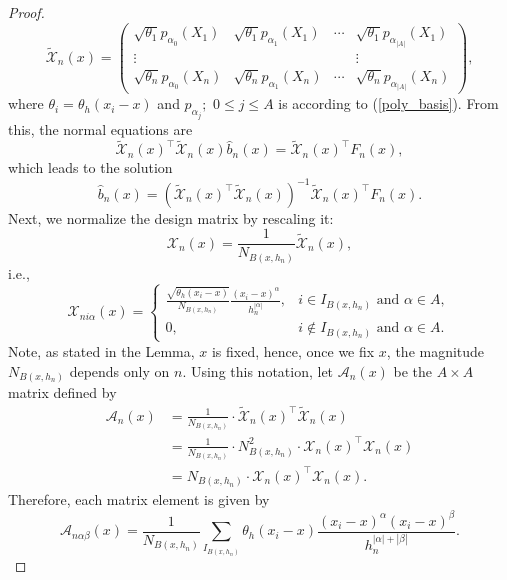 \documentclass{article}
\begin{document}
\begin{proof}
\begin{equation*}
    \tilde{\mathscr{X}}_n(x) = \left(
\begin{array}{cccc}
\sqrt{\theta_1} p_{\alpha_0}(X_1) & \sqrt{\theta_1} p_{\alpha_1}(X_1) & \cdots & \sqrt{\theta_1} p_{\alpha_{|A|}}(X_1) \\
\vdots & & & \vdots \\
\sqrt{\theta_n} p_{\alpha_0}(X_n) & \sqrt{\theta_n} p_{\alpha_1}(X_n) & \cdots & \sqrt{\theta_n} p_{\alpha_{|A|}}(X_n)
\end{array}
\right),
\end{equation*}
where $\theta_i=\theta_h(x_i-x)$ and $p_{\alpha_j}; \,\,0\leq j\leq A$ is according to (\ref{poly_basis}).
From this, the normal equations are
\[
 \tilde{\mathscr{X}}_n(x)^\top \tilde{\mathscr{X}}_n(x) \hat{b}_n(x) =   \tilde{\mathscr{X}}_n(x)^\top F_n(x),
\]
which leads to the solution
\[
\hat{b}_n(x) = (\tilde{\mathscr{X}}_n(x)^\top \tilde{\mathscr{X}}_n(x))^{-1} \tilde{\mathscr{X}}_n(x)^\top F_n(x).
\]
Next, we normalize the design matrix by rescaling it: 
\[
\mathscr{X}_n(x) = \frac{1}{N_{B\left(x, h_n\right)}} \tilde{\mathscr{X}}_n(x),
\]
i.e.,
$$\mathscr{X}_{n i \alpha}(x)= \begin{cases}\frac{\sqrt{\theta_h(x_i-x)}}{N_{B\left(x, h_n\right)}} \frac{\left(x_i-x\right)^\alpha}{h_n^{|\alpha|}}, & i \in I_{B\left(x, h_n\right)} \text { and } \alpha \in A, \\ 0, & i \notin I_{B\left(x, h_n\right)} \text { and } \alpha \in A.\end{cases}$$
Note, as stated in the Lemma, $x$ is fixed, hence, once we fix $x$, the magnitude $ N_{B\left(x, h_n\right)}$ depends only on $n$.
Using this notation, let $\mathscr{A}_n(x)$ be the $A \times A$ matrix defined by 
\begin{align*}
\mathscr{A}_n(x) 
&= \frac{1}{N_{B\left(x, h_n\right)}} \cdot \tilde{\mathscr{X}}_n(x)^\top \tilde{\mathscr{X}}_n(x) \\
&= \frac{1}{N_{B\left(x, h_n\right)}} \cdot N_{B\left(x, h_n\right)}^2 \cdot \mathscr{X}_n(x)^\top \mathscr{X}_n(x) \\
&= N_{B\left(x, h_n\right)} \cdot \mathscr{X}_n(x)^\top \mathscr{X}_n(x).
\end{align*}
Therefore, each matrix element is given by
\begin{equation}
    \mathscr{A}_{n \alpha \beta}(x) =\frac{1}{N_{B\left(x, h_n\right)}} \sum_{I_{B\left(x, h_n\right)}} \theta_h(x_i-x)\frac{\left(x_i-x\right)^\alpha\left(x_i-x\right)^\beta}{h_n^{|\alpha|+|\beta|}}. 

\end{equation}
\end{proof}
\end{document}
